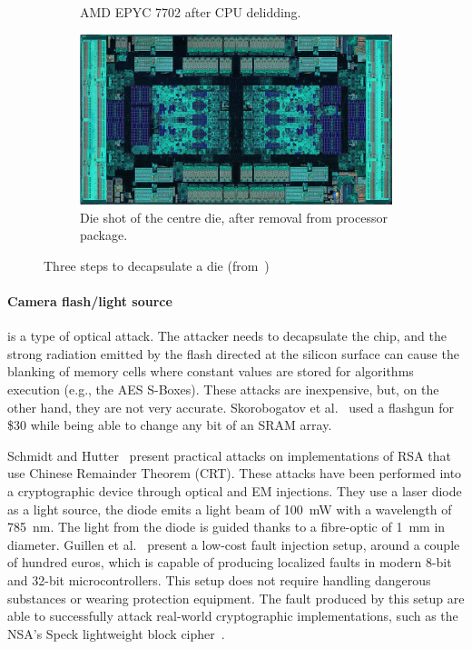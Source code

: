 \begin{figure}[ht]
\begin{subfigure}[b]{0.3\textwidth}
        \caption{\hfill AMD EPYC 7702 after CPU delidding.}
        \label{fig:delidding_die}
    \end{subfigure}
    \hfill
    \begin{subfigure}[b]{0.3\textwidth}
        \includegraphics[width=\textwidth]{c2_soa/img/epyc_7702_packagedRemoved.jpg}
        \caption{\hfill Die shot of the centre die, after removal from processor package.}
        \label{fig:packagedRemoved_die}
    \end{subfigure}
    \caption{Three steps to decapsulate a die (from~\cite{decapping-19-wikipedia})}
    \label{fig:decapsulating_die}
\end{figure}


\paragraph{Camera flash/light source} is a type of optical attack. The attacker needs to decapsulate the chip, and the strong radiation emitted by the flash directed at the silicon surface can cause the blanking of memory cells where constant values are stored for algorithms execution (e.g., the AES S-Boxes). These attacks are inexpensive, but, on the other hand, they are not very accurate. Skorobogatov et al.~\cite{SA-02-ches} used a flashgun for \$30 while being able to change any bit of an SRAM array.

Schmidt and Hutter~\cite{SH-07-austrochip} present practical attacks on implementations of RSA that use Chinese Remainder Theorem (CRT). These attacks have been performed into a cryptographic device through optical and EM injections. They use a laser diode  as a light source, the diode emits a light  beam of \SI{100}{\milli\watt} with a wavelength of \SI{785}{\nano\metre}. The light from the diode is guided thanks to a fibre-optic of 1~mm in diameter.
Guillen et al.~\cite{GGD-17-cosade} present a low-cost fault injection setup, around a couple of hundred euros, which is capable of producing localized faults in modern 8-bit and 32-bit microcontrollers. This setup does not require handling dangerous substances or wearing protection equipment. The fault produced by this setup are able to successfully attack real-world cryptographic implementations, such as the NSA’s Speck lightweight block cipher~\cite{RDJSBL-13-nsa}.

